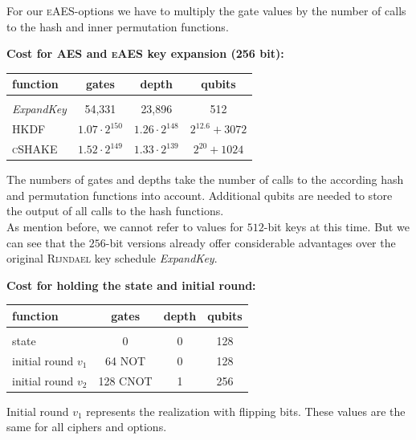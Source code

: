 \documentclass[a4paper,11pt]{article}
\begin{document}
\begin{otherlanguage}{english}
\begin{multicols}{2}
\noindent
For our \textsc{eAES}-options we have to multiply the gate values by the number of calls to the hash and inner permutation functions.

\begin{center}
\textbf{Cost for \textsc{AES} and \textsc{eAES} key expansion (256 bit):} \\
\vspace{0.2cm}
  \begin{tabular}{l|c|c|c}
  function &  gates & depth & qubits \\ 
  \hline
    &  &  & \\ [-8pt]
  \textit{ExpandKey} & 54,331  &  23,896 & 512 \\
  \textsc{HKDF} & $1.07 \cdot 2^{150}$ & $1.26 \cdot 2^{148}$ & $2^{12.6} + 3072$  \\  
  \textsc{cSHAKE} & $1.52 \cdot 2^{149}$ & $1.33 \cdot 2^{139}$ & $2^{20} + 1024$  \\  
  \end{tabular} 
\end{center} 

\noindent
The numbers of gates and depths take the number of calls to the according hash and permutation functions into account. Additional qubits are needed to store the output of all calls to the hash functions.\\

\noindent
As mention before, we cannot refer to values for $512$-bit keys at this time. But we can see that the $256$-bit versions already offer considerable advantages over the original \textsc{Rijndael} key schedule \textit{ExpandKey}. 

\begin{center}
\textbf{Cost for holding the state and initial round:} \\
\vspace{0.2cm}
  \begin{tabular}{l|c|c|c}
  function &  gates & depth & qubits \\ 
  \hline
    &  &  & \\ [-8pt]
  state & 0  &  0 & 128 \\
  initial round $v_1$ & 64 NOT & 0 & 128  \\ 
  initial round $v_2$ & 128 CNOT & 1 & 256  \\ 
  \end{tabular} 
\end{center}

\noindent
Initial round $v_1$ represents the realization with flipping bits. These values are the same for all ciphers and options. \\


\end{multicols}
\end{otherlanguage}
\end{document}

